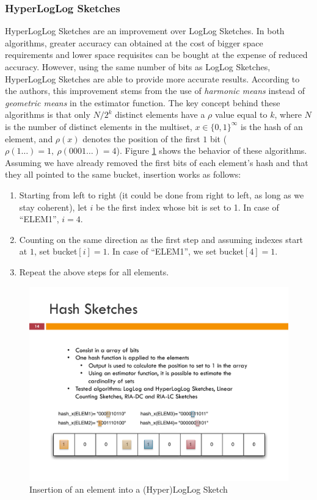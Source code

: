 \subsubsection{HyperLogLog Sketches}
\label{sec:hyperloglog-sketches}
HyperLogLog Sketches \cite{Fusy:2007um} are an improvement over LogLog
Sketches. In both algorithms, greater accuracy can obtained at the
cost of bigger space requirements and lower space requisites can be
bought at the expense of reduced accuracy. However, using the same
number of bits as LogLog Sketches, HyperLogLog Sketches are able to
provide more accurate results. According to the authors, this
improvement stems from the use of \emph{harmonic means} instead of
\emph{geometric means} in the estimator function. The key concept
behind these algorithms is that only $N/2^k$ distinct elements have a
$\rho$ value equal to $k$, where $N$ is the number of distinct
elements in the multiset, $x\in\{0,1\}^\infty$ is the hash of an
element, and $\rho(x)$ denotes the position of the first $1$ bit
($\rho(1\ldots)=1,\ \rho(0001\ldots)=4$). Figure
\ref{fig:hyperloglog_sketches} shows the behavior of these algorithms.
Assuming we have already removed the first bits of each element's hash
and that they all pointed to the same bucket, insertion works as
follows:
\begin{enumerate}
\item Starting from left to right (it could be done from right to
  left, as long as we stay coherent), let $i$ be the first
  index whose bit is set to 1. In case of ``ELEM1'', $i=4$.
\item Counting on the same direction as the first step and
  assuming indexes start at $1$, set bucket$[i]=1$. In case of
  ``ELEM1'', we set bucket$[4]=1$.
\item Repeat the above steps for all elements.
\end{enumerate}
\begin{figure}[htb]
  \centering
  \includegraphics[width=\textwidth]{images/hash_sketch.pdf}
  \caption{Insertion of an element into a (Hyper)LogLog Sketch}
  \label{fig:hyperloglog_sketches}
\end{figure}

